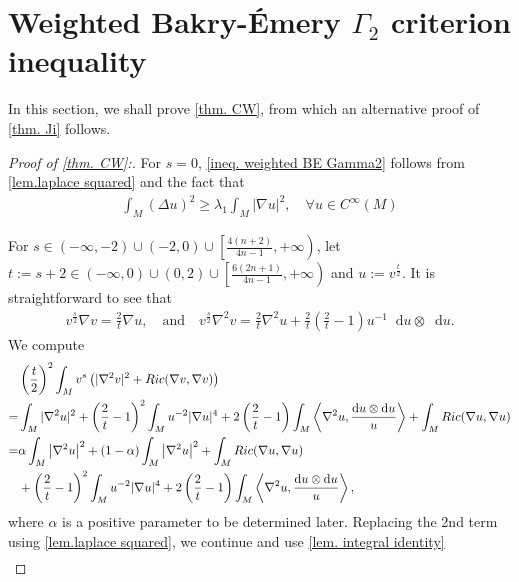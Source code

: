 \documentclass[11pt]{amsart}
\numberwithin{equation}{section}
\numberwithin{lemma}{section}
\numberwithin{proposition}{section}
\numberwithin{corollary}{section}
\numberwithin{remark}{section}
\newcommand{\dd}{\mathop{}\!\mathrm{d}}%
\begin{document}
 \section{Weighted Bakry-\'Emery $\Gamma_2$ criterion inequality}\label{sec. proof of thm}
 In this section, we shall prove \cref{thm. CW}, from which an alternative proof of \cref{thm. Ji} follows.
 \begin{proof}[Proof of \cref{thm. CW}:]
 For $s=0$, \cref{ineq. weighted BE Gamma2} follows from \cref{lem.laplace squared} and the fact that
 \begin{align*}
     \int_M (\Delta u)^2\geq 
     \lambda_1\int_M |\nabla u|^2,\quad \forall u\in C^{\infty}(M)
 \end{align*}
 
 For $s\in (-\infty,-2)\cup(-2,0)\cup\left[\frac{4(n+2)}{4n-1},+\infty\right)$, let $t:=s+2\in(-\infty,0)\cup(0,2)\cup\left[\frac{6(2n+1)}{4n-1},+\infty\right)$ and $u:=v^{\frac{t}{2}}$. It is straightforward to see that
 \begin{align*}
   v^{\frac{s}{2}} \nabla v
        =\frac{2}{t}\nabla u, \quad \text{and}\quad
        v^{\frac{s}{2}}\nabla^2v
        =\frac{2}{t}\nabla^2 u+
        \frac{2}{t}\left(\frac{2}{t}-1\right)
        u^{-1}\dd u\otimes \dd u.
 \end{align*}
 We compute 
 \begin{align*}
     & \left(\frac{t}{2}\right)^2
     \int_{M} v^s
     \left(|\nabla^2 v|^2
     +Ric(\nabla v,\nabla v)
     \right)\notag\\
     =&\int_M
     |\nabla^2 u|^2
     +\left(\frac{2}{t}-1\right)^2
     \int_M u^{-2}|\nabla u|^4
     +2\left(\frac{2}{t}-1\right)\int_M
     \left\langle\nabla^2 u,\frac{\dd u\otimes \dd u}{u}\right\rangle
     +\int_M Ric(\nabla u,\nabla u)\notag\\
     =&\alpha
     \int_M \left|\nabla^2 u\right|^2
     +(1-\alpha)\int_M \left|\nabla^2 u\right|^2
     +\int_M Ric(\nabla u,\nabla u)\notag
     \\
     &+\left(\frac{2}{t}-1\right)^2
     \int_M u^{-2}|\nabla u|^4
     +2\left(\frac{2}{t}-1\right)
     \int_M 
     \left\langle\nabla^2 u,
     \frac{\dd u\otimes \dd u}{u}\right\rangle\notag,\\
     \end{align*}
     where $\alpha$ is a positive parameter to be determined later. Replacing the 2nd term using \cref{lem.laplace squared}, we continue and use \cref{lem. integral identity}
     \begin{align}

\end{align}
\end{proof}
\end{document}
